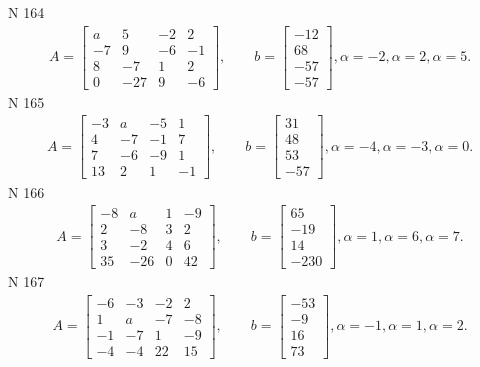 \documentclass[11pt]{report}
\begin{document}
N 164
\begin{align*}
 A = \left[\begin{matrix}a & 5 & -2 & 2\\-7 & 9 & -6 & -1\\8 & -7 & 1 & 2\\0 & -27 & 9 & -6\end{matrix}\right],
    \qquad b = \left[\begin{matrix}-12\\68\\-57\\-57\end{matrix}\right], \alpha = -2, \alpha = 2, \alpha = 5. 
 \end{align*}
N 165
\begin{align*}
 A = \left[\begin{matrix}-3 & a & -5 & 1\\4 & -7 & -1 & 7\\7 & -6 & -9 & 1\\13 & 2 & 1 & -1\end{matrix}\right],
    \qquad b = \left[\begin{matrix}31\\48\\53\\-57\end{matrix}\right], \alpha = -4, \alpha = -3, \alpha = 0. 
 \end{align*}
N 166
\begin{align*}
 A = \left[\begin{matrix}-8 & a & 1 & -9\\2 & -8 & 3 & 2\\3 & -2 & 4 & 6\\35 & -26 & 0 & 42\end{matrix}\right],
    \qquad b = \left[\begin{matrix}65\\-19\\14\\-230\end{matrix}\right], \alpha = 1, \alpha = 6, \alpha = 7. 
 \end{align*}
N 167
\begin{align*}
 A = \left[\begin{matrix}-6 & -3 & -2 & 2\\1 & a & -7 & -8\\-1 & -7 & 1 & -9\\-4 & -4 & 22 & 15\end{matrix}\right],
    \qquad b = \left[\begin{matrix}-53\\-9\\16\\73\end{matrix}\right], \alpha = -1, \alpha = 1, \alpha = 2. 
 \end{align*}
\end{document}
